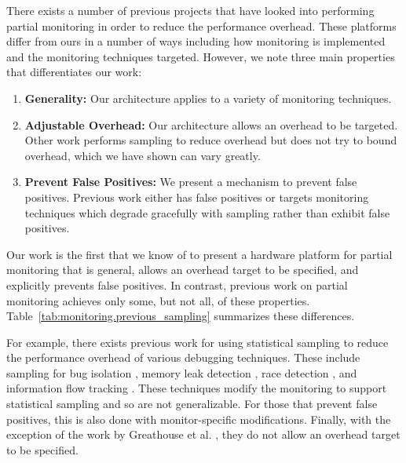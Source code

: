 There exists a number of previous projects that have looked into performing
partial monitoring in order to reduce the performance overhead. These
platforms differ from ours in a number of ways including how monitoring is
implemented and the monitoring techniques targeted. However, we note three main
properties that differentiates our work:
\begin{enumerate}
  \item \textbf{Generality:} Our architecture applies to a variety of monitoring techniques.
  \item \textbf{Adjustable Overhead:} Our architecture allows an overhead to be
  targeted. Other work performs sampling to reduce overhead but does not try
  to bound overhead, which we have shown can vary greatly.
  \item \textbf{Prevent False Positives:} We present a mechanism to prevent
  false positives. Previous work either has false positives or targets monitoring
  techniques which degrade gracefully with sampling rather than exhibit false
  positives.
\end{enumerate}
Our work is the first that we know of to present a hardware platform for partial
monitoring that is general, allows an overhead target to be specified, and
explicitly prevents false positives. In contrast, previous work on
partial monitoring achieves only some, but not all, of these properties.
Table~\ref{tab:monitoring.previous_sampling} summarizes these differences. 

For example, there exists previous work for using statistical sampling to
reduce the performance overhead of various debugging techniques. These include
sampling for bug isolation \cite{liblit-pldi05}, memory leak detection
\cite{chilimbi-asplos04}, race detection \cite{literace-pldi09, pacer-pldi10},
and information flow tracking \cite{testudo-micro08, greathouse-cgo11}. These
techniques modify the monitoring to support statistical sampling and so are not
generalizable. For those that prevent false positives, this is also done with
monitor-specific modifications. Finally, with the exception of the work by
Greathouse et al. \cite{greathouse-cgo11}, they do not allow an overhead target
to be specified.

